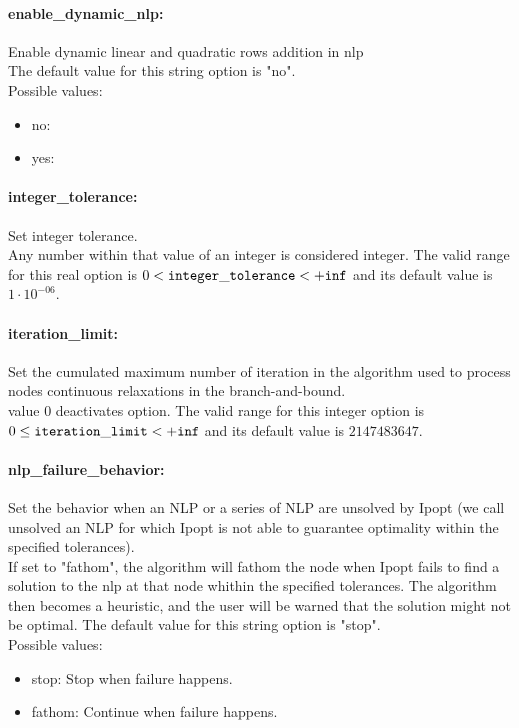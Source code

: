 \paragraph{enable\_dynamic\_nlp:}\label{sec:enable_dynamic_nlp} Enable dynamic linear and quadratic rows addition in nlp $\;$ \\

The default value for this string option is "no".
\\ 
Possible values:
\begin{itemize}
   \item no: 
   \item yes: 
\end{itemize}

\paragraph{integer\_tolerance:}\label{sec:integer_tolerance} Set integer tolerance. $\;$ \\
 Any number within that value of an integer is
considered integer. The valid range for this real option is 
$0 <  {\tt integer\_tolerance } <  {\tt +inf}$
and its default value is $1 \cdot 10^{-06}$.


\paragraph{iteration\_limit:}\label{sec:iteration_limit} Set the cumulated maximum number of iteration in the algorithm used to process nodes continuous relaxations in the branch-and-bound. $\;$ \\
 value 0 deactivates option. The valid range for this integer option is
$0 \le {\tt iteration\_limit } <  {\tt +inf}$
and its default value is $2147483647$.


\paragraph{nlp\_failure\_behavior:}\label{sec:nlp_failure_behavior} Set the behavior when an NLP or a series of NLP are unsolved by Ipopt (we call unsolved an NLP for which Ipopt is not able to guarantee optimality within the specified tolerances). $\;$ \\
 If set to "fathom", the algorithm will fathom the
node when Ipopt fails to find a solution to the
nlp at that node whithin the specified
tolerances. The algorithm then becomes a
heuristic, and the user will be warned that the
solution might not be optimal.
The default value for this string option is "stop".
\\ 
Possible values:
\begin{itemize}
   \item stop: Stop when failure happens.
   \item fathom: Continue when failure happens.
\end{itemize}

